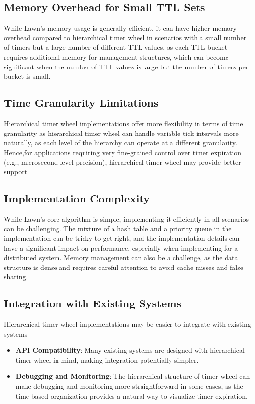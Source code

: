 \documentclass[conference]{IEEEtran}
\begin{document}
\subsection{Memory Overhead for Small TTL Sets}
While Lawn's memory usage is generally efficient, it can have higher memory overhead compared to hierarchical timer wheel in scenarios with a small number of timers but a large number of different TTL values, as each TTL bucket requires additional memory for management structures, which can become significant when the number of TTL values is large but the number of timers per bucket is small.

\subsection{Time Granularity Limitations}
Hierarchical timer wheel implementations offer more flexibility in terms of time granularity as hierarchical timer wheel can handle variable tick intervals more naturally, as each level of the hierarchy can operate at a different granularity. Hence,for applications requiring very fine-grained control over timer expiration (e.g., microsecond-level precision), hierarchical timer wheel may provide better support. 

\subsection{Implementation Complexity}
While Lawn's core algorithm is simple, implementing it efficiently in all scenarios can be challenging. The mixture of a hash table and a priority queue in the implementation can be tricky to get right, and the implementation details can have a significant impact on performance, especially when implementing for a distributed system. Memory management can also be a challenge, as the data structure is dense and requires careful attention to avoid cache misses and false sharing.

\subsection{Integration with Existing Systems}
Hierarchical timer wheel implementations may be easier to integrate with existing systems:

\begin{itemize}
    \item \textbf{API Compatibility}: Many existing systems are designed with hierarchical timer wheel in mind, making integration potentially simpler.
    
    \item \textbf{Debugging and Monitoring}: The hierarchical structure of timer wheel can make debugging and monitoring more straightforward in some cases, as the time-based organization provides a natural way to visualize timer expiration.
\end{itemize}
\end{document}
